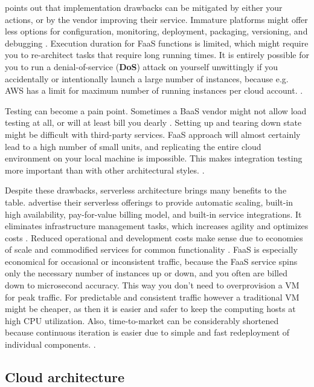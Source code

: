 \documentclass[utf8,english]{gradu3}
\begin{document}
\textcite{Roberts2018} points out that implementation drawbacks can be
mitigated by either your actions, or by the vendor improving their service.
Immature platforms might offer less options for configuration, monitoring,
deployment, packaging, versioning, and debugging \parencite{Roberts2018}.
Execution duration for FaaS functions is limited, which might require you to
re-architect tasks that require long running times. It is entirely possible for
you to run a denial-of-service (\textbf{DoS}) attack on yourself unwittingly if
you accidentally or intentionally launch a large number of instances, because
e.g.  AWS has a limit for maximum number of running instances per cloud account.
\parencite{Roberts2018}.

Testing can become a pain point. Sometimes a BaaS vendor might not allow load
testing at all, or will at least bill you dearly \parencite{Roberts2018}.
Setting up and tearing down state might be difficult with third-party services.
FaaS approach will almost certainly lead to a high number of small units, and
replicating the entire cloud environment on your local machine is impossible. This
makes integration testing more important than with other architectural styles.
\parencite{Roberts2018}.

Despite these drawbacks, serverless architecture brings many benefits to the
table. \textcite{AWS-serverless} advertise their serverless offerings to provide
automatic scaling, built-in high availability, pay-for-value billing model, and
built-in service integrations. It eliminates infrastructure management tasks,
which increases agility and optimizes costs \parencite{AWS-serverless}. Reduced
operational and development costs make sense due to economies of scale and
commodified services for common functionality \parencite{Roberts2018}. FaaS is
especially economical for occasional or inconsistent traffic, because the FaaS
service spins only the necessary number of instances up or down, and you often
are billed down to microsecond accuracy. This way you don't need to overprovision a
VM for peak traffic. For predictable and consistent traffic however a
traditional VM might be cheaper, as then it is easier and safer to keep the computing hosts at
high CPU utilization. Also, time-to-market can be considerably shortened because
continuous iteration is easier due to simple and fast redeployment of individual
components. \parencite{Roberts2018}.


\subsection{Cloud architecture}
\end{document}
